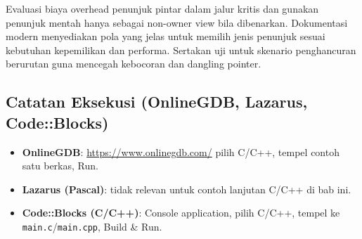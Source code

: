 \documentclass[../main.tex]{subfiles}
\begin{document}
Evaluasi biaya overhead penunjuk pintar dalam jalur kritis dan gunakan penunjuk mentah hanya sebagai non-owner view bila dibenarkan. Dokumentasi modern menyediakan pola yang jelas untuk memilih jenis penunjuk sesuai kebutuhan kepemilikan dan performa. Sertakan uji untuk skenario penghancuran berurutan guna mencegah kebocoran dan dangling pointer.
\subsection{Catatan Eksekusi (OnlineGDB, Lazarus, Code::Blocks)}
\begin{itemize}
  \item \textbf{OnlineGDB}: \url{https://www.onlinegdb.com/} \textrightarrow{} pilih C/C++, tempel contoh satu berkas, Run.
  \item \textbf{Lazarus (Pascal)}: tidak relevan untuk contoh lanjutan C/C++ di bab ini.
  \item \textbf{Code::Blocks (C/C++)}: Console application, pilih C/C++, tempel ke \texttt{main.c}/\texttt{main.cpp}, Build \& Run.
\end{itemize}
\end{document}
